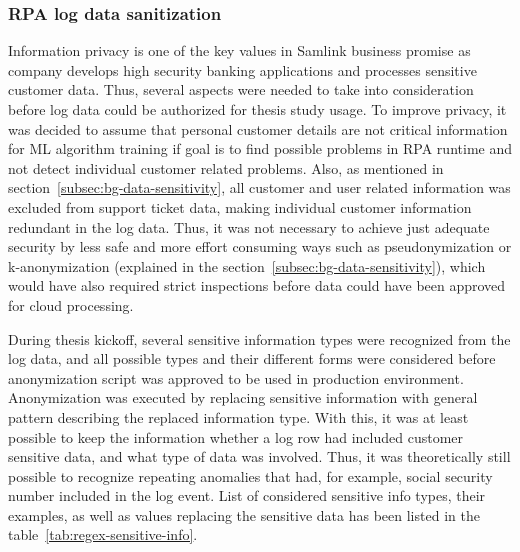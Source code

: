 \subsubsection*{RPA log data sanitization}
Information privacy is one of the key values in Samlink business promise
as company develops high security banking applications
and processes sensitive customer data.
Thus, several aspects were needed to take into consideration
before log data could be authorized for thesis study usage.
To improve privacy,
it was decided to assume
that personal customer details are not critical information
for ML algorithm training
if goal is to find possible problems in RPA runtime
and not detect individual customer related problems.
Also,
as mentioned in section~\ref{subsec:bg-data-sensitivity},
all customer and user related information was excluded from support ticket data,
making individual customer information redundant in the log data.
Thus,
it was not necessary to achieve just adequate security
by less safe and more effort consuming ways
such as pseudonymization or k-anonymization
(explained in the section~\ref{subsec:bg-data-sensitivity}),
which would have also required strict inspections
before data could have been approved for cloud processing.

During thesis kickoff,
several sensitive information types were recognized from the log data,
and all possible types and their different forms were considered
before anonymization script was approved to be used in production environment.
Anonymization was executed by replacing sensitive information
with general pattern describing the replaced information type.
With this,
it was at least possible to keep the information
whether a log row had included customer sensitive data,
and what type of data was involved.
Thus,
it was theoretically still possible to recognize repeating anomalies
that had, for example,
social security number included in the log event.
List of considered sensitive info types, their examples,
as well as values replacing the sensitive data
has been listed in the table~\ref{tab:regex-sensitive-info}.

